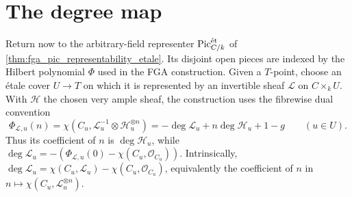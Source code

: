 \section{The degree map}
\label{sec:pic_degree}

Return now to the arbitrary-field representer \(\operatorname{Pic}^{\mathrm{\acute{e}t}}_{C/k}\) of
\cref{thm:fga_pic_representability_etale}. Its disjoint open pieces are indexed
by the Hilbert polynomial \(\Phi\) used in the FGA construction. Given a
\(T\)-point, choose an \'etale cover \(U\to T\) on which it is represented by
an invertible sheaf \(\mathcal L\) on \(C\times_kU\). With \(\mathcal H\) the
chosen very ample sheaf, the construction uses the fibrewise dual convention
\[
  \Phi_{\mathcal L,u}(n)
  =\chi(C_u,\mathcal L_u^{-1}\otimes\mathcal H_u^{\otimes n})
  =-\deg\mathcal L_u+n\deg\mathcal H_u+1-g
  \qquad (u\in U).
\]
Thus its coefficient of \(n\) is \(\deg\mathcal H_u\), while
\(\deg\mathcal L_u=-(\Phi_{\mathcal L,u}(0)-
\chi(C_u,\mathcal O_{C_u}))\). Intrinsically,
\(\deg\mathcal L_u=\chi(C_u,\mathcal L_u)-
\chi(C_u,\mathcal O_{C_u})\), equivalently the coefficient of \(n\) in
\(n\mapsto\chi(C_u,\mathcal L_u^{\otimes n})\).

